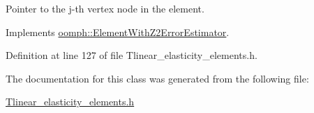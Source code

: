 Pointer to the j-\/th vertex node in the element. 



Implements \hyperlink{classoomph_1_1ElementWithZ2ErrorEstimator_a0eedccc33519f852c5dc2055ddf2774b}{oomph\+::\+Element\+With\+Z2\+Error\+Estimator}.



Definition at line 127 of file Tlinear\+\_\+elasticity\+\_\+elements.\+h.



The documentation for this class was generated from the following file\+:\begin{DoxyCompactItemize}
\item 
\hyperlink{Tlinear__elasticity__elements_8h}{Tlinear\+\_\+elasticity\+\_\+elements.\+h}\end{DoxyCompactItemize}
